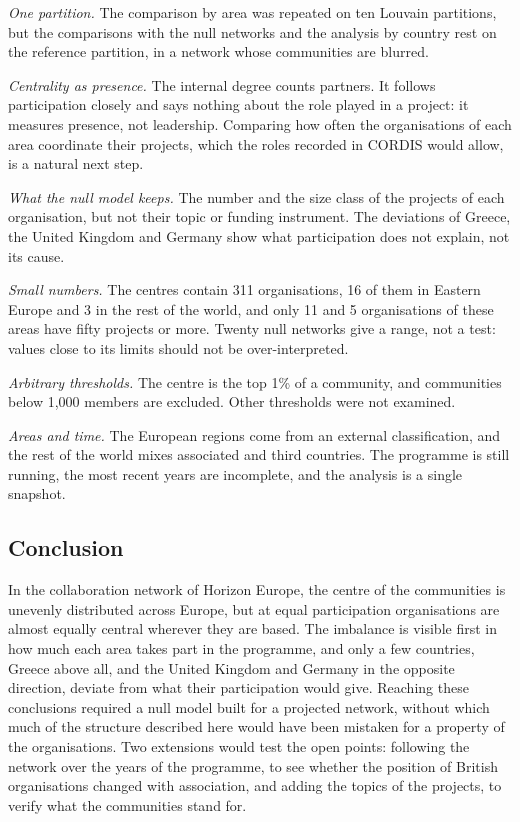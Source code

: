 \documentclass[sigchi]{acmart}
\begin{document}
\emph{One partition.} The comparison by area was repeated on ten Louvain partitions, but the comparisons with the null networks and the analysis by country rest on the reference partition, in a network whose communities are blurred.

\emph{Centrality as presence.} The internal degree counts partners. It follows participation closely and says nothing about the role played in a project: it measures presence, not leadership. Comparing how often the organisations of each area coordinate their projects, which the roles recorded in CORDIS would allow, is a natural next step.

\emph{What the null model keeps.} The number and the size class of the projects of each organisation, but not their topic or funding instrument. The deviations of Greece, the United Kingdom and Germany show what participation does not explain, not its cause.

\emph{Small numbers.} The centres contain 311 organisations, 16 of them in Eastern Europe and 3 in the rest of the world, and only 11 and 5 organisations of these areas have fifty projects or more. Twenty null networks give a range, not a test: values close to its limits should not be over-interpreted.

\emph{Arbitrary thresholds.} The centre is the top 1\% of a community, and communities below 1,000 members are excluded. Other thresholds were not examined.

\emph{Areas and time.} The European regions come from an external classification, and the rest of the world mixes associated and third countries. The programme is still running, the most recent years are incomplete, and the analysis is a single snapshot.

\subsection{Conclusion}

In the collaboration network of Horizon Europe, the centre of the communities is unevenly distributed across Europe, but at equal participation organisations are almost equally central wherever they are based. The imbalance is visible first in how much each area takes part in the programme, and only a few countries, Greece above all, and the United Kingdom and Germany in the opposite direction, deviate from what their participation would give. Reaching these conclusions required a null model built for a projected network, without which much of the structure described here would have been mistaken for a property of the organisations. Two extensions would test the open points: following the network over the years of the programme, to see whether the position of British organisations changed with association, and adding the topics of the projects, to verify what the communities stand for.



\end{document}

